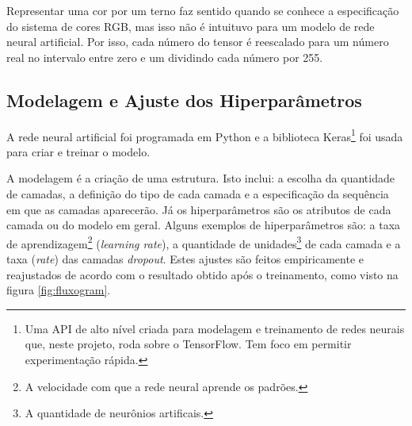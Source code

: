 Representar uma cor por um terno faz sentido quando se conhece a especificação do sistema de cores RGB, mas isso não é intuituvo para um modelo de rede neural artificial. Por isso, cada número do tensor é reescalado para um número real no intervalo entre zero e um dividindo cada número por 255.

\subsection*{Modelagem e Ajuste dos Hiperparâmetros}

A rede neural artificial foi programada em Python e a biblioteca Keras\footnote{Uma API de alto nível criada para modelagem e treinamento de redes neurais que, neste projeto, roda sobre o TensorFlow. Tem foco em permitir experimentação rápida.} foi usada para criar e treinar o modelo.

A modelagem é a criação de uma estrutura. Isto inclui: a escolha da quantidade de camadas, a definição do tipo de cada camada e a especificação da sequência em que as camadas aparecerão. Já os hiperparâmetros são os atributos de cada camada ou do modelo em geral. Alguns exemplos de hiperparâmetros são: a taxa de aprendizagem\footnote{A velocidade com que a rede neural aprende os padrões.} (\emph{learning rate}), a quantidade de unidades\footnote{A quantidade de neurônios artificais.} de cada camada e a taxa (\emph{rate}) das camadas \emph{dropout}. Estes ajustes são feitos empiricamente e reajustados de acordo com o resultado obtido após o treinamento, como visto na figura \ref{fig:fluxogram}.

\pagebreak

\begin{figure}[h!]
  \centering
  \begin{minipage}[t]{.47\textwidth}
    \centering
    
    \label{fig:conv_model}
  \end{minipage}%
  \hfill%
  \begin{minipage}[t]{.47\textwidth}
    \centering
    
    \label{fig:pretrained_model}
  \end{minipage}
  \end{figure}

